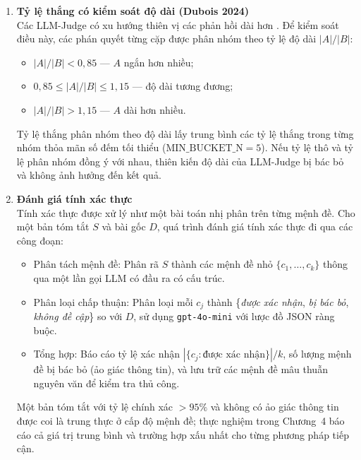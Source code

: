 \begin{enumerate}[label=(\alph*), leftmargin=*]
    \item \textbf{Tỷ lệ thắng có kiểm soát độ dài (Dubois 2024)} \\
    Các LLM-Judge có xu hướng thiên vị các phản hồi dài hơn \cite{Dubois2024}. Để kiểm soát điều này, các phán quyết từng cặp được phân nhóm theo tỷ lệ độ dài $|A|/|B|$:

    \begin{itemize}
        \item $|A|/|B| < 0{,}85$ --- $A$ ngắn hơn nhiều;
        \item $0{,}85 \leq |A|/|B| \leq 1{,}15$ --- độ dài tương đương;
        \item $|A|/|B| > 1{,}15$ --- $A$ dài hơn nhiều.
    \end{itemize}

    \noindent Tỷ lệ thắng phân nhóm theo độ dài lấy trung bình các tỷ lệ thắng trong từng nhóm thỏa mãn số đếm tối thiểu ($\text{MIN\_BUCKET\_N} = 5$). Nếu tỷ lệ thô và tỷ lệ phân nhóm đồng ý với nhau, thiên kiến độ dài của LLM-Judge bị bác bỏ và không ảnh hưởng đến kết quả.

    \item \textbf{Đánh giá tính xác thực} \\
    Tính xác thực được xử lý như một bài toán nhị phân trên từng mệnh đề. Cho một bản tóm tắt $S$ và bài gốc $D$, quá trình đánh giá tính xác thực đi qua các công đoạn:

    \begin{itemize}
        \item Phân tách mệnh đề: Phân rã $S$ thành các mệnh đề nhỏ $\{c_1, \ldots, c_k\}$ thông qua một lần gọi LLM có đầu ra có cấu trúc.
        \item Phân loại chấp thuận: Phân loại mỗi $c_j$ thành \{\textit{được xác nhận}, \textit{bị bác bỏ}, \textit{không đề cập}\} so với $D$, sử dụng \texttt{gpt-4o-mini} với lược đồ JSON ràng buộc.
        \item Tổng hợp: Báo cáo tỷ lệ xác nhận $|\{c_j : \text{được xác nhận}\}| / k$, số lượng mệnh đề bị bác bỏ (ảo giác thông tin), và lưu trữ các mệnh đề mâu thuẫn nguyên văn để kiểm tra thủ công.
    \end{itemize}

    Một bản tóm tắt với tỷ lệ chính xác $> 95\%$ và không có ảo giác thông tin được coi là trung thực ở cấp độ mệnh đề; thực nghiệm trong Chương~4 báo cáo cả giá trị trung bình và trường hợp xấu nhất cho từng phương pháp tiếp cận.

\end{enumerate}

